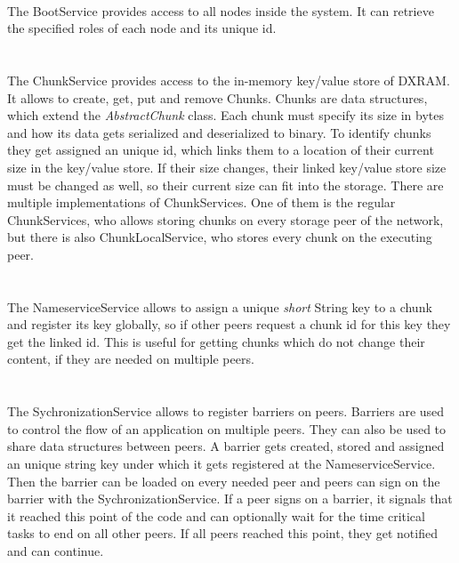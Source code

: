 \\
The BootService provides access to all nodes inside the system. It can retrieve the specified roles of each node and its unique id.\\\\
\\
The ChunkService provides access to the in-memory key/value store of DXRAM. It allows to create, get, put and remove Chunks. Chunks are data structures, which extend the \textit{AbstractChunk} class. Each chunk must specify its size in bytes and how its data gets serialized and deserialized to binary. To identify chunks they get assigned an unique id, which links them to a location of their current size in the key/value store. If their size changes, their linked key/value store size must be changed as well, so their current size can fit into the storage. There are multiple implementations of ChunkServices. One of them is the regular ChunkServices, who allows storing chunks on every storage peer of the network, but there is also ChunkLocalService, who stores every chunk on the executing peer.\\\\
\\
The NameserviceService allows to assign a unique \textit{short} String key to a chunk and register its key globally, so if other peers request a chunk id for this key they get the linked id. This is useful for getting chunks which do not change their content, if they are needed on multiple peers.\\\\
\\
The SychronizationService allows to register barriers on peers. Barriers are used to control the flow of an application on multiple peers. They can also be used to share data structures between peers. A barrier gets created, stored and assigned an unique string key under which it gets registered at the NameserviceService. Then the barrier can be loaded on every needed peer and peers can sign on the barrier with the SychronizationService. If a peer signs on a barrier, it signals that it reached this point of the code and can optionally wait for the time critical tasks to end on all other peers. If all peers reached this point, they get notified and can continue.\\\\
\newpage
